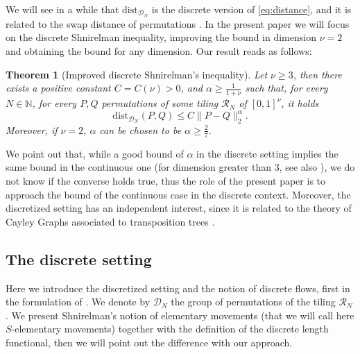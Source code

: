 \documentclass[12 pt]{article}
\theoremstyle{definition} \newtheorem{definition}{Definition}[section]
\theoremstyle{definition} \newtheorem{remark}[definition]{Remark}
\theoremstyle{plain} \newtheorem{lemma}[definition]{Lemma}
\theoremstyle{plain} \newtheorem{proposition}[definition]{Proposition}
\theoremstyle{plain} \newtheorem{theorem}[definition]{Theorem}
\theoremstyle{plain} \newtheorem{corollary}[definition]{Corollary}
\theoremstyle{definition} \newtheorem{example}[definition]{Example}
\theoremstyle{definition} \newtheorem{assumption}[definition]{Assumption}
\theoremstyle{definition} \newtheorem{conjecture}[definition]{Conjecture}
\newcommand{\N}{\mathbb{N}}
\newcommand{\1}{\mathbbm 1}
\numberwithin{equation}{section}
\begin{document}
We will see in a while that $\text{dist}_{\mathcal{D}_N}$ is the discrete version of \eqref{eq:distance}, and it is related to the swap distance of permutations \cite{DistPermutations}. In the present paper we will focus on the discrete Shnirelman inequality, improving the bound in dimension $\nu=2$ and obtaining the bound for any dimension. Our result reads as follows:
\begin{theorem}[Improved discrete Shnirelman's inequality]\label{thm:ineq:discrete}
    Let $\nu\geq 3$, then there exists a positive constant $C=C(\nu)>0$, and $\alpha\geq \frac{1}{1+\nu}$ such that, for every $N\in\N$, for every $P,Q$ permutations of some tiling $\mathcal{R}_N$ of $[0,1]^\nu$, it holds
    \begin{equation}
        \text{dist}_{\mathcal{D}_N}(P,Q)\leq C\|P-Q\|_2^\alpha.
    \end{equation}
    Moreover, if $\nu=2$, $\alpha$ can be chosen to be $\alpha\geq\frac{2}{7}.$
\end{theorem}
We point out that, while a good bound of $\alpha$ in the discrete setting implies the same bound in the continuous one (for dimension greater than $3$, see also \cite{Arnold:khesin}), we do not know if the converse holds true, thus the role of the present paper is to approach the bound of the continuous case in the discrete context. Moreover, the discretized setting has an independent interest, since it is related to the theory of Cayley Graphs associated to transposition trees \cite{DohanKim}.



\subsection{The discrete setting}
Here we introduce the discretized setting and the notion of discrete flows, first in the formulation of \cite{Shnirelman}.
We denote by $\mathcal{D}_N$ the group of permutations of the tiling $\mathcal{R}_N$. We present Shnirelman's notion of elementary movements (that we will call here $S$-elementary movements) together with the definition of the discrete length functional, then we will point out the difference with our approach. 
\end{document}

